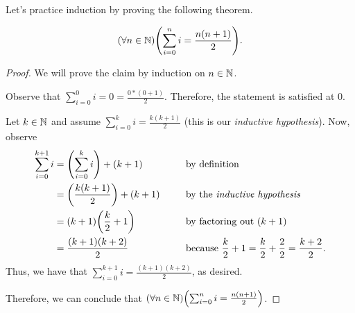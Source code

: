 Let's practice induction by proving the following theorem.
\newpage
\begin{theorem}\label{thm:gaussiansum}
    \[
        \pn*{\forall n \in \N}\pn*{\sum_{i = 0}^{n}i = \frac{n(n + 1)}{2}}.
    \]
\end{theorem}
\begin{proof}
    We will prove the claim by induction on \(n \in \mathbb{N}\).

    \begin{case}
        Observe that \(\sum_{i = 0}^{0}i = 0 = \frac{0*(0 + 1)}{2}\).
        Therefore, the statement is satisfied at \(0\).
    \end{case}

    \begin{case}
        Let \(k \in \mathbb{N}\) and assume \(\sum_{i = 0}^{k}i = \frac{k(k + 1)}{2}\)
        (this is our \emph{inductive hypothesis}).
        Now, observe
        \begin{alignat*}{2}
            \sum_{i = 0}^{k + 1}i &= \pn*{\sum_{i = 0}^{k}i} + (k + 1) &&\text{ by definition}\\
                                  &= \pn*{\frac{k(k + 1)}{2}} + (k + 1)~~~~&&\text{ by the \emph{inductive hypothesis}}\\
                                  &= (k + 1)\pn*{\frac{k}{2} + 1} &&\text{ by factoring out } (k + 1)\\
                                  &= \frac{(k + 1)(k + 2)}{2} &&\text{ because } \frac{k}{2} + 1 = \frac{k}{2} + \frac{2}{2} = \frac{k + 2}{2}.
        \end{alignat*}
        Thus, we have that \(\sum_{i = 0}^{k + 1}i = \frac{(k + 1)(k + 2)}{2}\), as desired.
    \end{case}

    Therefore, we can conclude that \(\pn*{\forall n \in \N}\pn*{\sum_{i = 0}^{n}i = \frac{n(n + 1)}{2}}\).
\end{proof}


